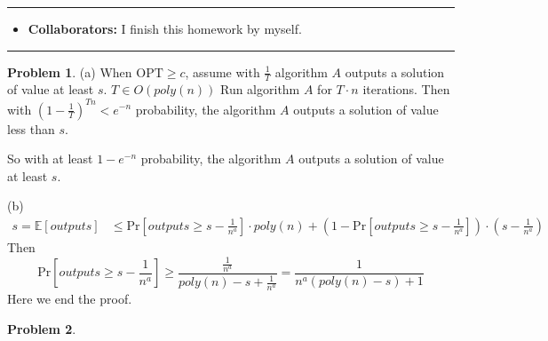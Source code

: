 \documentclass[a4paper]{article}
\theoremstyle{definition}
\newtheorem{problem}{Problem}
\theoremstyle{plain}
\newcommand{\Ebb}{\mathbb E}
\newcommand{\OPT}{\mathrm{OPT}}
\numberwithin{equation}{problem}
\begin{document}
\courseheader
{}
\rule{\textwidth}{1pt}
\begin{itemize}
\item {\bf Collaborators: \/}
  I finish this homework by myself. 
\end{itemize}
\rule{\textwidth}{1pt}

\vspace{2em}


\sloppy
{}

\begin{problem}
    (a) When  $ \OPT \geq c $, assume with  $ \frac{1}{T} $ algorithm  $ A $  outputs a solution of value at least  $ s $.  $ T\in O(poly(n)) $  Run algorithm  $ A $ for  $ T\cdot n $ iterations. Then with  $ (1-\frac{1}{T})^{Tn}<e^{-n} $ probability, the algorithm  $ A $  outputs a solution of value less than  $ s $.

    So with at least  $ 1-e^{-n} $ probability, the algorithm  $ A $  outputs a solution of value at least  $ s $.

    (b)
    \[\begin{aligned}
        s=\Ebb[outputs]& \leq \mathrm{Pr}[outputs \geq s-\frac{1}{n^a}]\cdot poly(n)+(1-\mathrm{Pr}[outputs \geq s-\frac{1}{n^a}])\cdot (s-\frac{1}{n^a})
    \end{aligned}\]
    Then
    \[\mathrm{Pr}[outputs \geq s-\frac{1}{n^a}]  \geq \frac{\frac{1}{n^a}}{poly(n)-s+\frac{1}{n^a}}=\frac{1}{n^a (poly(n)-s)+1}\]
    Here we end the proof.
\end{problem}
\begin{problem}
  
\end{problem}
\end{document}
